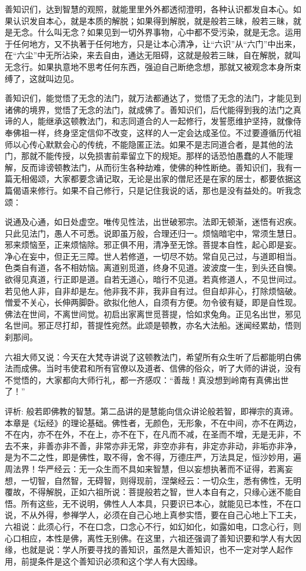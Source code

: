 \documentclass[12pt,twoside,openany]{book}
\newcommand{\kai}[1]{{\CJKfamily{kai}#1}}
\begin{document}
\kai{善知识们，达到智慧的观照，就能里里外外都透彻澄明，各种认识都发自本心。如果认识发自本心，就是本质的解脱；如果得到解脱，就是般若三昧，般若三昧，就是无念。什么叫无念？如果见到一切外界事物，心中都不受污染，就是无念。运用于任何地方，又不执著于任何地方，只是让本心清净，让“六识”从“六门”中出来，在“六尘”中无所沾染，来去自由，通达无阻碍，这就是般若三昧，自在解脱，就叫无念行。如果执意地不思考任何东西，强迫自己断绝念想，那就又被观念本身所束缚了，这就叫边见。
	
善知识们，能觉悟了无念的法门，就万法都通达了，觉悟了无念的法门，才能见到诸佛的境界，觉悟了无念的法门，就成佛了。善知识们，后代能得到我的法门之真谛的人，能继承这顿教法门，和志同道合的人一起修行，发誓愿维护坚持，就像侍奉佛祖一样，终身坚定信仰不改变，这样的人一定会达成圣位。不过要遵循历代祖师以心传心默默会心的传统，不能隐匿正法。如果不是志同道合者，是其他的法门，那就不能传授，以免损害前辈留立下的规矩。那样的话恐怕愚蠢的人不能理解，反而诽谤顿教法门，从而衍生各种劫难，使佛的种性断绝。善知识们，我有一篇无相偈颂，大家都要念诵记取，无论是出家的僧尼还是在家的居士，都要依据这篇偈语来修行。如果不自己修行，只是记住我说的话，那也是没有益处的。听我念颂：

说通及心通，如日处虚空。唯传见性法，出世破邪宗。法即无顿渐，迷悟有迟疾。只此见法门，愚人不可悉。说即虽万般，合理还归一。烦恼暗宅中，常须生慧日。邪来烦恼至，正来烦恼除。邪正俱不用，清净至无馀。菩提本自性，起心即是妄。净心在妄中，但正无三障。世人若修道，一切尽不妨。常自见己过，与道即相当。色类自有道，各不相妨恼。离道别觅道，终身不见道。波波度一生，到头还自懊。欲得见真道，行正即是道。自若无道心，暗行不见道。若真修道人，不见世间过。若见他人非，自非却是左。他非我不非，我非自有过。但自却非心，打除烦恼破。憎爱不关心，长伸两脚卧。欲拟化他人，自须有方便。勿令彼有疑，即是自性现。佛法在世间，不离世间觉。初启出家离世觅菩提，恰如求兔角。正见名出世，邪见名世间。邪正尽打却，菩提性宛然。此颂是顿教，亦名大法船。迷闻经累劫，悟则刹那间。

六祖大师又说：今天在大梵寺讲说了这顿教法门，希望所有众生听了后都能明白佛法而成佛。当时韦使君和所有官僚以及道者、信佛的俗众，听了大师的讲说，没有不觉悟的，大家都向大师行礼，都一齐感叹：“善哉！真没想到岭南有真佛出世了！”}

\kai{评析: 般若即佛教的智慧。第二品讲的是慧能向信众讲论般若智，即禅宗的真谛。本章是《坛经》的理论基础。佛性者，无颜色，无形象，不在中间，亦不在两边，不在内，亦不在外，不在上，亦不在下，在凡而不减，在圣而不增，无是无非，不去不来，非善亦非不善，非常亦非无常，非空亦非有，非定亦非动，非垢亦非净，是为不二之性，即是佛性，取不得，舍不得，万德庄严，万法具足，恒沙妙用，遍周法界！华严经云：无一众生而不具如来智慧，但以妄想执著而不证得，若离妄想，一切智，自然智，无碍智，则得现前，涅槃经云：一切众生，悉有佛性，无明覆故，不得解脱，正如六祖所说：菩提般若之智，世人本自有之，只缘心迷不能自悟。所有这些，无不说明，佛性人人本具，只要识已本心，就能见已本性，不在口说，不从外得，参禅学人，必须在自己心地上真参实悟，要在自己心地上下工夫，六祖说：此须心行，不在口念，口念心不行，如幻如化，如露如电，口念心行，则心口相应，本性是佛，离性无别佛。在这里，六祖还强调了善知识要和学人有大因缘，也就是说：学人所要寻找的善知识，虽然是大善知识，也不一定对学人起作用，前提条件是这个善知识必须和这个学人有大因缘。}
\end{document}
